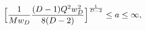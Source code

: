 \begin{equation}
\Big[{1\over Mw_D}{(D-1)Q^2w_D^2\over{8(D-2)}}\Big]^{1\over {D -2}} \le a 
\le
\infty,
\end{equation}

